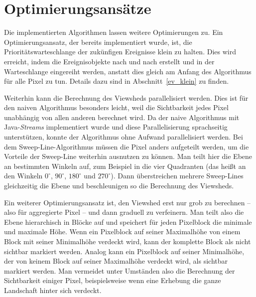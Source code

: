\section{Optimierungsansätze}
Die implementierten Algorithmen lassen weitere Optimierungen zu.
Ein Optimierungsansatz, der bereits implementiert wurde, ist, die Prioritätswarteschlange der zukünfigen Ereignisse klein zu halten.
Dies wird erreicht, indem die Ereignisobjekte nach und nach erstellt und in der Warteschlange eingereiht werden,
anstatt dies gleich am Anfang des Algorithmus für alle Pixel zu tun.
Details dazu sind in Abschnitt~\ref{ev_klein} zu finden.

Weiterhin kann die Berechnung des Viewsheds parallelisiert werden.
Dies ist für den naiven Algorithmus besonders leicht, weil die Sichtbarkeit jedes Pixel unabhängig von allen anderen berechnet wird.
Da der naive Algorithmus mit Java-\emph{Streams} implementiert wurde und diese Parallelisierung sprachseitig unterstützen,
konnte der Algorithmus ohne Aufwand parallelisiert werden.
Bei dem Sweep-Line-Algorithmus müssen die Pixel anders aufgeteilt werden, um die Vorteile der Sweep-Line weiterhin ausnutzen zu können.
Man teilt hier die Ebene an bestimmten Winkeln auf, zum Beispiel in die vier Quadranten (das heißt an den Winkeln $0^\circ$, $90^\circ$, $180^\circ$ und $270^\circ$).
Dann überstreichen mehrere Sweep-Lines gleichzeitig die Ebene und beschleunigen so die Berechnung des Viewsheds.

Ein weiterer Optimierungsansatz ist, den Viewshed erst nur grob zu berechnen -- also für aggregierte Pixel -- und dann graduell zu verfeinern.
Man teilt also die Ebene hierarchisch in Blöcke auf und speichert für jeden Pixelblock die minimale und maximale Höhe.
Wenn ein Pixelblock auf seiner Maximalhöhe von einem Block mit seiner Minimalhöhe verdeckt wird, kann der komplette Block als nicht sichtbar markiert werden.
Analog kann ein Pixelblock auf seiner Minimalhöhe, der von keinem Block auf seiner Maximalhöhe verdeckt wird, als sichtbar markiert werden.
Man vermeidet unter Umständen also die Berechnung der Sichtbarkeit einiger Pixel, beispielsweise wenn eine Erhebung die ganze Landschaft hinter sich verdeckt.
